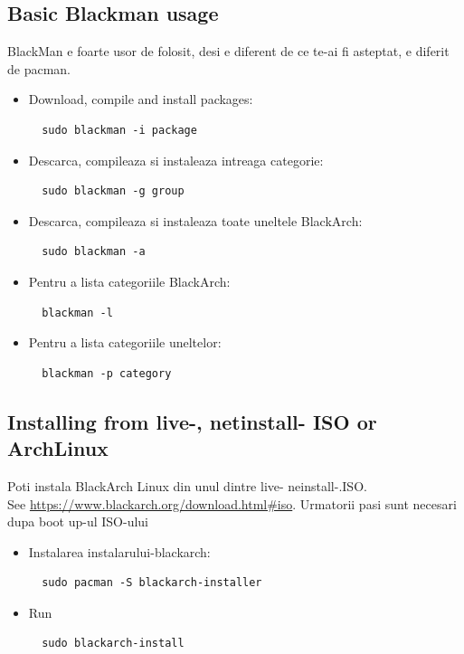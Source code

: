 \documentclass[a4paper, oneside, 11pt]{book}
\begin{document}
\subsection{Basic Blackman usage} BlackMan e foarte usor de folosit, desi e diferent de ce te-ai fi asteptat, e diferit de pacman.
\begin{itemize}
\item Download, compile and install packages:
\begin{lstlisting}
  sudo blackman -i package
\end{lstlisting}

\item Descarca, compileaza si instaleaza intreaga categorie:
\begin{lstlisting}
  sudo blackman -g group
\end{lstlisting}

\item Descarca, compileaza si instaleaza toate uneltele BlackArch:
\begin{lstlisting}
  sudo blackman -a
\end{lstlisting}

\item Pentru a lista categoriile BlackArch:
\begin{lstlisting}
  blackman -l
\end{lstlisting}

\item Pentru a lista categoriile uneltelor:
\begin{lstlisting}
  blackman -p category
\end{lstlisting}

\end{itemize}

\subsection{Installing from live-, netinstall- ISO or ArchLinux}
Poti instala BlackArch Linux din unul dintre live- neinstall-.ISO.\\See
\url{https://www.blackarch.org/download.html#iso}. Urmatorii pasi sunt necesari dupa boot up-ul ISO-ului
\begin{itemize}
\item Instalarea instalarului-blackarch:
\begin{lstlisting}
  sudo pacman -S blackarch-installer
\end{lstlisting}

\item Run
\begin{lstlisting}
  sudo blackarch-install
\end{lstlisting}

\end{itemize}
\end{document}
